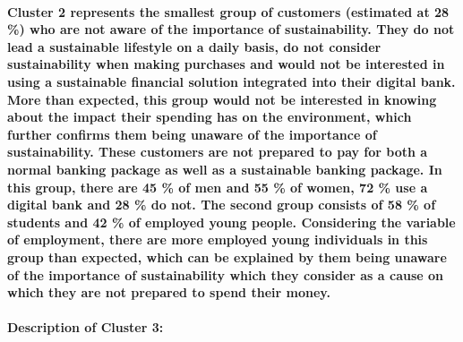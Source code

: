 \documentclass[
]{article}
\begin{document}
{\paragraph{Cluster 2 represents the smallest group of customers
(estimated at 28 \%) who are not aware of the importance of
sustainability. They do not lead a sustainable lifestyle on a daily
basis, do not consider sustainability when making purchases and would
not be interested in using a sustainable financial solution integrated
into their digital bank. More than expected, this group would not be
interested in knowing about the impact their spending has on the
environment, which further confirms them being unaware of the importance
of sustainability. These customers are not prepared to pay for both a
normal banking package as well as a sustainable banking package. In this
group, there are 45 \% of men and 55 \% of women, 72 \% use a digital
bank and 28 \% do not. The second group consists of 58 \% of students
and 42 \% of employed young people. Considering the variable of
employment, there are more employed young individuals in this group than
expected, which can be explained by them being unaware of the importance
of sustainability which they consider as a cause on which they are not
prepared to spend their
money.}\label{cluster-2-represents-the-smallest-group-of-customers-estimated-at-28-who-are-not-aware-of-the-importance-of-sustainability.-they-do-not-lead-a-sustainable-lifestyle-on-a-daily-basis-do-not-consider-sustainability-when-making-purchases-and-would-not-be-interested-in-using-a-sustainable-financial-solution-integrated-into-their-digital-bank.-more-than-expected-this-group-would-not-be-interested-in-knowing-about-the-impact-their-spending-has-on-the-environment-which-further-confirms-them-being-unaware-of-the-importance-of-sustainability.-these-customers-are-not-prepared-to-pay-for-both-a-normal-banking-package-as-well-as-a-sustainable-banking-package.-in-this-group-there-are-45-of-men-and-55-of-women-72-use-a-digital-bank-and-28-do-not.-the-second-group-consists-of-58-of-students-and-42-of-employed-young-people.-considering-the-variable-of-employment-there-are-more-employed-young-individuals-in-this-group-than-expected-which-can-be-explained-by-them-being-unaware-of-the-importance-of-sustainability-which-they-consider-as-a-cause-on-which-they-are-not-prepared-to-spend-their-money.}}

\hypertarget{description-of-cluster-3}{%
\paragraph{Description of Cluster 3:}\label{description-of-cluster-3}}
\end{document}
